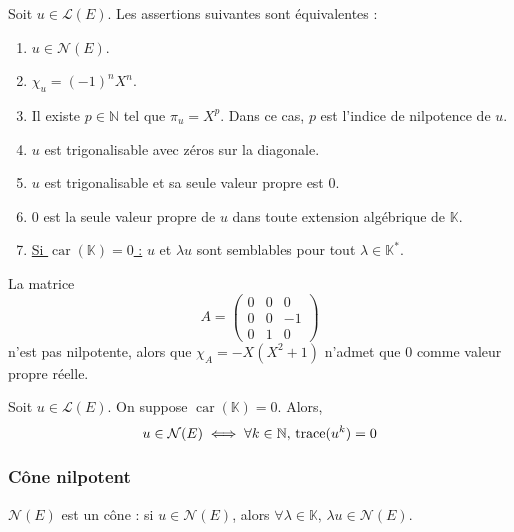   \begin{theorem}
    \label{156-1}
    Soit $u \in \mathcal{L}(E)$. Les assertions suivantes sont équivalentes :
    \begin{enumerate}[label=(\roman*)]
      \item $u \in \mathcal{N}(E)$.
      \item $\chi_u = (-1)^n X^n$.
      \item Il existe $p \in \mathbb{N}$ tel que $\pi_u = X^p$. Dans ce cas, $p$ est l'indice de nilpotence de $u$.
      \item $u$ est trigonalisable avec zéros sur la diagonale.
      \item $u$ est trigonalisable et sa seule valeur propre est $0$.
      \item $0$ est la seule valeur propre de $u$ dans toute extension algébrique de $\mathbb{K}$.
      \item \uline{Si $\operatorname{car}(\mathbb{K}) = 0$ :} $u$ et $\lambda u$ sont semblables pour tout $\lambda \in \mathbb{K}^*$.
    \end{enumerate}
  \end{theorem}

  \begin{cexample}
    La matrice
    \[
      A = \begin{pmatrix}
        0 & 0 & 0 \\
        0 & 0 & -1 \\
        0 & 1 & 0
      \end{pmatrix}
    \]
    n'est pas nilpotente, alors que $\chi_A = -X(X^2 + 1)$ n'admet que $0$ comme valeur propre réelle.
  \end{cexample}

  \begin{proposition}
    Soit $u \in \mathcal{L}(E)$. On suppose $\operatorname{car}(\mathbb{K}) = 0$. Alors,
    \[ u \in \mathcal{N}(E) \iff \forall k \in \mathbb{N}, \, \operatorname{trace}(u^k) = 0 \]
  \end{proposition}

  \subsubsection{Cône nilpotent}

  \begin{proposition}
    $\mathcal{N}(E)$ est un cône : si $u \in \mathcal{N}(E)$, alors $\forall \lambda \in \mathbb{K}, \, \lambda u \in \mathcal{N}(E)$.
  \end{proposition}


